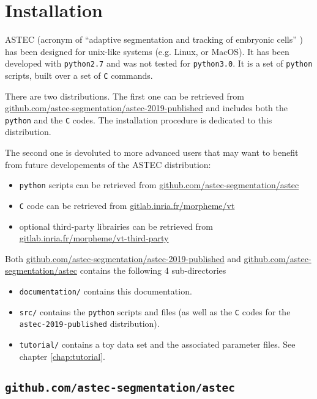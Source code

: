 
\chapter{Installation}

ASTEC (acronym of ``adaptive segmentation and tracking of embryonic
cells'' \cite{guignard:tel-01278725}) has been designed for unix-like
systems (e.g. Linux, or MacOS).
%
It has been developed with \texttt{python2.7} and was not tested for
\texttt{python3.0}.
%
It is a set of \texttt{python} scripts, built over a set of \texttt{C} commands.


There are two distributions. The first one can be retrieved from
\url{github.com/astec-segmentation/astec-2019-published} and includes
both the \texttt{python} and the \texttt{C} codes. The installation
procedure is dedicated to this distribution.

The second one is devoluted to more advanced users that may want to
benefit from future developements of the ASTEC distribution:
\begin{itemize}
\itemsep -0.5ex
\item \texttt{python} scripts can be retrieved from
  \url{github.com/astec-segmentation/astec}
\item \texttt{C} code can be retrieved from
  \url{gitlab.inria.fr/morpheme/vt}
\item optional third-party librairies can be retrieved from  \url{gitlab.inria.fr/morpheme/vt-third-party}
\end{itemize}  

Both \url{github.com/astec-segmentation/astec-2019-published} and
\url{github.com/astec-segmentation/astec} contains the following 4
sub-directories

\mbox{}
\mbox{}

\begin{itemize}
\itemsep -0.5ex
\item \texttt{documentation/} contains this documentation.
\item \texttt{src/} contains the \texttt{python} scripts and files (as
  well as the \texttt{C} codes for the \texttt{astec-2019-published} distribution).
\item \texttt{tutorial/} contains a toy data set and the associated
  parameter files. See chapter \ref{chap:tutorial}.
\end{itemize}  


\section{\texttt{github.com/astec-segmentation/astec}}

